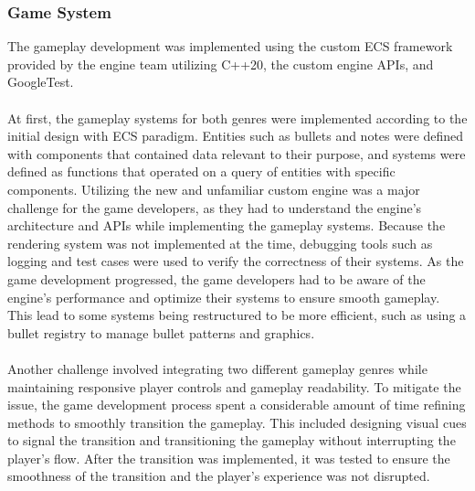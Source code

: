 \subsubsection*{Game System}
The gameplay development was implemented using the custom ECS framework provided by the engine team utilizing
C++20, the custom engine APIs, and GoogleTest.
\\\\
At first, the gameplay systems for both genres were implemented according to the initial design with ECS paradigm.
Entities such as bullets and notes were defined with components that contained data relevant to their purpose,
and systems were defined as functions that operated on a query of entities with specific components.
Utilizing the new and unfamiliar custom engine was a major challenge for the game developers, as they had to understand
the engine's architecture and APIs while implementing the gameplay systems.
Because the rendering system was not implemented at the time, debugging tools such as logging and test cases were used
to verify the correctness of their systems.
As the game development progressed, the game developers had to be aware of the engine's performance and optimize their
systems to ensure smooth gameplay.
This lead to some systems being restructured to be more efficient, such as using a bullet registry to manage bullet patterns
and graphics.
\\\\
Another challenge involved integrating two different gameplay genres while maintaining responsive player controls and gameplay
readability.
To mitigate the issue, the game development process spent a considerable amount of time refining methods to smoothly transition
the gameplay.
This included designing visual cues to signal the transition and transitioning the gameplay without interrupting the player's flow.
After the transition was implemented, it was tested to ensure the smoothness of the transition and the player's experience
was not disrupted.


